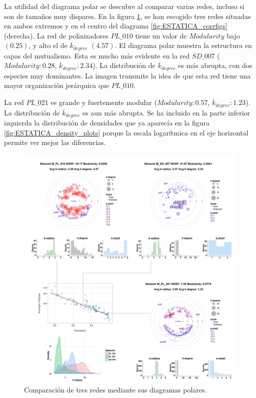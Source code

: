 La utilidad del diagrama polar se descubre al comparar varias redes, incluso si son de tamaños muy dispares. En la figura \ref{fig:VIS_Modvskdegree3}, se han escogido tres redes situadas en ambos extremos y en el centro del diagrama \ref{fig:ESTATICA_corrfigs} (derecha). La red de polinizadores $PL\_010$  tiene un valor de $Modularity$ bajo $(0.25)$, y alto el de $\overline {k}_{degree}$ $(4.57)$. El diagrama polar muestra la estructura en capas del mutualismo. Esta es mucho más evidente en la red $SD\_007$ ($Modularity: 0.28$, $\overline {k}_{degree}: 2.34$). La distribución de $\overline {k}_{degree}$ es más abrupta, con dos especies muy dominantes. La imagen transmite la idea de que esta red tiene una mayor organización jerárquica que $PL\_010$.

La red $PL\_021$ es grande y fuertemente modular ($Modularity: 0.57$, $\overline {k}_{degree}: 1.23$). La distribución de $\overline {k}_{degree}$ es aun más abrupta. Se ha incluido en la parte inferior izquierda la distribución de densidades que ya aparecía en la figura \ref{fig:ESTATICA_density_plots} porque la escala logarítmica en el eje horizontal permite ver mejor las diferencias.

\begin{figure}[h!]
\centering
\includegraphics[scale=0.75]{Figures/VIS_Modvskdegree3.PDF}
\caption[PolarExample]{Comparación de tres redes mediante sus diagramas polares.}
\label{fig:VIS_Modvskdegree3}
\end{figure}


